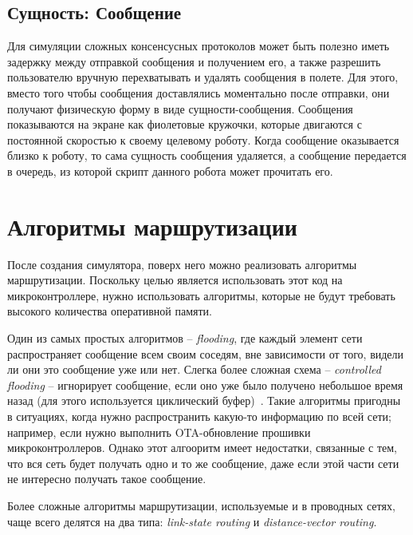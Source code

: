 \documentclass[%
]{report}
\begin{document}
\section{Сущность: Сообщение}

Для симуляции сложных консенсусных протоколов
может быть полезно иметь задержку между отправкой сообщения
и получением его,
а также разрешить пользователю вручную перехватывать и удалять сообщения в полете.
Для этого, вместо того чтобы сообщения доставлялись моментально после отправки,
они получают физическую форму в виде сущности-сообщения.
Сообщения показываются на экране как фиолетовые кружочки,
которые двигаются с постоянной скоростью к своему целевому роботу.
Когда сообщение оказывается близко к роботу,
то сама сущность сообщения удаляется,
а сообщение передается в очередь,
из которой скрипт данного робота может прочитать его.

\chapter{Алгоритмы маршрутизации}

После создания симулятора,
поверх него можно реализовать алгоритмы маршрутизации.
Поскольку целью является использовать этот код на микроконтроллере,
нужно использовать алгоритмы, которые не будут требовать высокого
количества оперативной памяти.

Один из самых простых алгоритмов -- \emph{flooding},
где каждый элемент сети распространяет сообщение
всем своим соседям, вне зависимости от того, видели ли они это сообщение уже или нет.
Слегка более сложная схема -- \emph{controlled flooding} -- игнорирует сообщение,
если оно уже было получено небольшое время назад (для этого
используется циклический буфер)~\cite{rahman2004controlled}.
Такие алгоритмы пригодны в ситуациях,
когда нужно распространить какую-то информацию по всей сети;
например, если нужно выполнить OTA-обновление прошивки микроконтроллеров.
Однако этот алгооритм имеет недостатки,
связанные с тем, что вся сеть будет получать одно и то же сообщение,
даже если этой части сети не интересно получать такое сообщение.

Более сложные алгоритмы маршрутизации,
используемые и в проводных сетях,
чаще всего делятся на два типа:
\emph{link-state routing} и \emph{distance-vector routing}.
\end{document}
